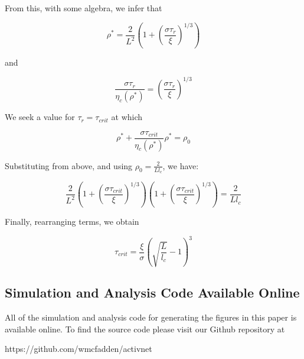 \documentclass[10pt,letterpaper]{article}
\begin{document}
From this, with some algebra, we infer that

\begin{equation}
\label{drho_4}
\rho^* = \frac{2}{L^2}\left ( 1 + \left( \frac{\sigma\tau_r}{\xi}\right )^{1/3} \right )
\end{equation}

and 

\begin{equation}
\label{drho_5}
\frac{\sigma\tau_r}{\eta_c(\rho^*)} =  \left( \frac{\sigma\tau_r}{\xi}\right )^{1/3} 
\end{equation}

We seek a value for $\tau_r=\tau_{crit}$ at which


\begin{equation}
\label{drho_6}
\rho^* + \frac{\sigma\tau_{crit}}{\eta_c(\rho^*)}\rho^* =  \rho_0
\end{equation}

Substituting from above, and using $\rho_0=\frac{2}{L l_c}$, we have:

\begin{equation}
\label{drho_7}
\frac{2}{L^2}\left ( 1 + \left( \frac{\sigma\tau_{crit}}{\xi}\right )^{1/3}  \right )
\left ( 1 + \left( \frac{\sigma\tau_{crit}}{\xi}\right )^{1/3}  \right )
= \frac{2}{L l_c}
\end{equation}

Finally, rearranging terms, we obtain

\begin{equation}
\label{drho_8}
\tau_{crit}=\frac{\xi}{\sigma}\left( \sqrt{\frac{L}{l_c}}-1\right )^3
\end{equation}

\subsection{Simulation and Analysis Code Available Online}
All of the simulation and analysis code for generating the figures in this paper is available online.  To find the source code please visit our Github repository at 

https://github.com/wmcfadden/activnet
\end{document}

